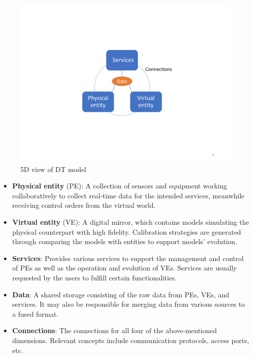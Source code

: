 \begin{figure}[hbt!]
  \centering
  \includegraphics[scale=0.5]{figures/tao5d.pdf}
  \caption{5D view of DT model}
  \label{fig:tao5d}
\end{figure}

\begin{itemize}

  \item \textbf{Physical entity} (PE): A collection of sensors and equipment working collaboratively to collect real-time data for the intended services, meanwhile receiving control orders from the virtual world.    

  \item \textbf{Virtual entity} (VE): A digital mirror, which contains models simulating the physical counterpart with high fidelity. Calibration strategies are generated through comparing the models with entities to support models' evolution.
  
  \item \textbf{Services}: Provides various services to support the management and control of PEs as well as the operation and evolution of VEs. Services are usually requested by the users to fulfill certain functionalities.
       
  \item \textbf{Data}: A shared storage consisting of the raw data from PEs, VEs, and services. It may also be responsible for merging data from various sources to a fused format. 
   
  \item \textbf{Connections}: The connections for all four of the above-mentioned dimensions. Relevant concepts include communication protocols, access ports, etc.
  
\end{itemize}

